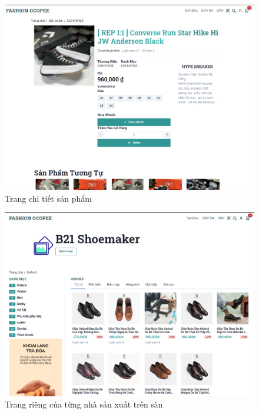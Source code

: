 \begin{figure}[!htbp]\fontsize{13px}{13px}\selectfont
	\begin{center}	
		\includegraphics[width=\textwidth]{./results/product-page}
		\caption{Trang chi tiết sản phẩm}
	\end{center}
\end{figure}
\clearpage
\FloatBarrier
\begin{figure}[!htbp]\fontsize{13px}{13px}\selectfont
	\begin{center}	
		\includegraphics[width=\textwidth]{./results/store-page}
		\caption{Trang riêng của từng nhà sản xuất trên sàn}
	\end{center}
\end{figure}